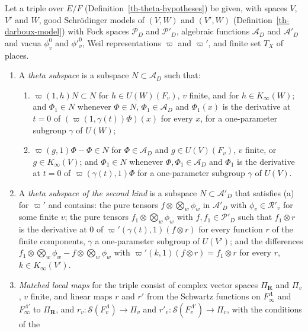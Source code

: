 \begin{definition}\label{th-kernel-theta-subspace}
Let a triple over $E/F$ (Definition~\ref{th-theta-hypotheses}) be given, with
spaces $V$, $V'$ and $W$, good Schrödinger models of $(V,W)$ and $(V',W)$
(Definition~\ref{th-darboux-model}) with Fock spaces $\mathcal P_D$ and
$\mathcal P'_D$, algebraic functions $\mathcal A_D$ and $\mathcal A'_D$ and
vacua $\phi^0_v$ and $\phi'^0_v$, Weil representations $\varpi$ and $\varpi'$,
and finite set $T_X$ of places.
\begin{enumerate}
\item A \emph{theta subspace} is a subspace $N\subset\mathcal A_D$ such that:
  \begin{enumerate}
  \item[(a)] $\varpi(1,h)N\subset N$ for $h\in U(W)(F_v)$, $v$ finite, and for
    $h\in K_\infty(W)$; and $\Phi_1\in N$ whenever $\Phi\in N$,
    $\Phi_1\in\mathcal A_D$ and $\Phi_1(x)$ is the derivative at $t=0$ of
    $(\varpi(1,\gamma(t))\Phi)(x)$ for every $x$, for a one-parameter subgroup
    $\gamma$ of $U(W)$;
  \item[(b)] $\varpi(g,1)\Phi-\Phi\in N$ for $\Phi\in\mathcal A_D$ and
    $g\in U(V)(F_v)$, $v$ finite, or $g\in K_\infty(V)$; and $\Phi_1\in N$
    whenever $\Phi,\Phi_1\in\mathcal A_D$ and $\Phi_1$ is the derivative at
    $t=0$ of $\varpi(\gamma(t),1)\Phi$ for a one-parameter subgroup $\gamma$ of
    $U(V)$.
  \end{enumerate}
\item A \emph{theta subspace of the second kind} is a subspace
  $N\subset\mathcal A'_D$ that satisfies (a) for $\varpi'$ and contains: the
  pure tensors $f\otimes\bigotimes_w\phi_w$ in $\mathcal A'_D$ with
  $\phi_v\in\mathcal R'_v$ for some finite $v$; the pure tensors
  $f_1\otimes\bigotimes_w\phi_w$ with $f,f_1\in\mathcal P'_D$ such that
  $f_1\otimes r$ is the derivative at $0$ of $\varpi'(\gamma(t),1)(f\otimes r)$
  for every function $r$ of the finite components, $\gamma$ a one-parameter
  subgroup of $U(V')$; and the differences
  $f_1\otimes\bigotimes_w\phi_w-f\otimes\bigotimes_w\phi_w$ with
  $\varpi'(k,1)(f\otimes r)=f_1\otimes r$ for every $r$, $k\in K_\infty(V')$.
\item \emph{Matched local maps} for the triple consist of complex vector spaces
  $\Pi_{\mathbf R}$ and $\Pi_v$, $v$ finite, and linear maps $r$ and $r'$
  from the Schwartz functions on $F_\infty^\Lambda$ and $F_\infty^{\Lambda'}$
  to $\Pi_{\mathbf R}$, and $r_v\colon\mathcal S(F_v^\Lambda)\to\Pi_v$ and
  $r'_v\colon\mathcal S(F_v^{\Lambda'})\to\Pi_v$, with the conditions of the

\end{enumerate}
\end{definition}
